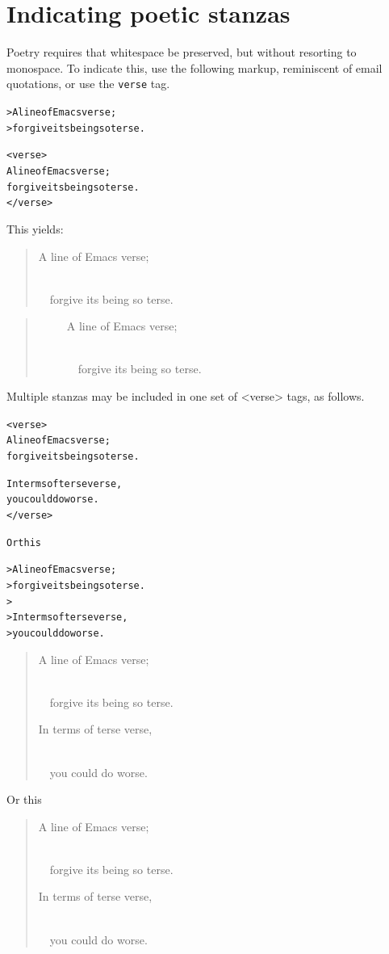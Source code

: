 \documentclass[DIV=12,%
               BCOR=0mm,%
               fontsize=10pt,%
               oneside,%
               paper=210mm:11in]{scrbook}
\newcommand*{\forcelinebreak}{\strut\\{}}
\begin{document}
\section{Indicating poetic stanzas}


Poetry requires that whitespace be preserved, but without resorting to
monospace.  To indicate this, use the following markup, reminiscent of
email quotations, or use the \texttt{verse} tag.


\begin{alltt}
> A line of Emacs verse;
>   forgive its being so terse.

<verse>
     A line of Emacs verse;
       forgive its being so terse.
</verse>

\end{alltt}


This yields:



\begin{verse}
A line of Emacs verse;\forcelinebreak
~~forgive its being so terse.
\end{verse}



\begin{verse}
~~~~~A line of Emacs verse;\forcelinebreak
~~~~~~~forgive its being so terse.
\end{verse}


Multiple stanzas may be included in one set of <verse> tags, as
follows.


\begin{alltt}
<verse>
A line of Emacs verse;
  forgive its being so terse.

In terms of terse verse,
  you could do worse.
</verse>

Or this

> A line of Emacs verse;
>   forgive its being so terse.
>
> In terms of terse verse,
>   you could do worse.


\end{alltt}



\begin{verse}
A line of Emacs verse;\forcelinebreak
~~forgive its being so terse.

In terms of terse verse,\forcelinebreak
~~you could do worse.
\end{verse}


Or this



\begin{verse}
A line of Emacs verse;\forcelinebreak
~~forgive its being so terse.

In terms of terse verse,\forcelinebreak
~~you could do worse.
\end{verse}
\end{document}
